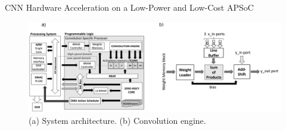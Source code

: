 	\begin{frame}{CNN Hardware Acceleration on a Low-Power and Low-Cost APSoC}
	\centering
	\begin{figure}
		\includegraphics[width=\textwidth]{../figures/4_g.png}
		\caption{(a) System architecture. (b) Convolution engine.}
	\end{figure}
	\end{frame}